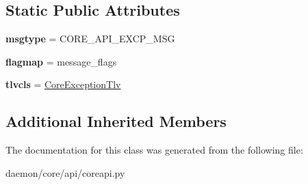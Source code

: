 \subsection*{Static Public Attributes}
\begin{DoxyCompactItemize}
\item 
\hypertarget{classcore_1_1api_1_1coreapi_1_1_core_exception_message_a0007cb2ac03c7682b0d78ecc356f220b}{{\bfseries msgtype} = C\+O\+R\+E\+\_\+\+A\+P\+I\+\_\+\+E\+X\+C\+P\+\_\+\+M\+S\+G}\label{classcore_1_1api_1_1coreapi_1_1_core_exception_message_a0007cb2ac03c7682b0d78ecc356f220b}

\item 
\hypertarget{classcore_1_1api_1_1coreapi_1_1_core_exception_message_a0a76d47486361035e65ee92ebf86b29c}{{\bfseries flagmap} = message\+\_\+flags}\label{classcore_1_1api_1_1coreapi_1_1_core_exception_message_a0a76d47486361035e65ee92ebf86b29c}

\item 
\hypertarget{classcore_1_1api_1_1coreapi_1_1_core_exception_message_afefea52c674fba86eef55731a4a6361b}{{\bfseries tlvcls} = \hyperlink{classcore_1_1api_1_1coreapi_1_1_core_exception_tlv}{Core\+Exception\+Tlv}}\label{classcore_1_1api_1_1coreapi_1_1_core_exception_message_afefea52c674fba86eef55731a4a6361b}

\end{DoxyCompactItemize}
\subsection*{Additional Inherited Members}


The documentation for this class was generated from the following file\+:\begin{DoxyCompactItemize}
\item 
daemon/core/api/coreapi.\+py\end{DoxyCompactItemize}
